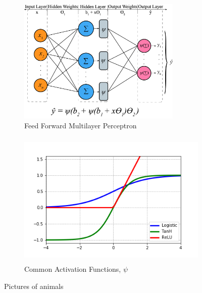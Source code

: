 	\begin{figure}
    \centering
    \begin{subfigure}[b]{0.55\textwidth}
        \includegraphics[height = 6cm, width=\textwidth]{img/mlp.png}
        \caption{Feed Forward Multilayer Perceptron}
        \label{fig:mlp}
    \end{subfigure}
    \hfill
    \begin{subfigure}[b]{0.44\textwidth}
        \includegraphics[height = 6.5cm, width=\textwidth]{img/actfunc.png}
        \caption{Common Activation Functions, $\psi$}
        \label{fig:tiger}
    \end{subfigure}
    \caption{Pictures of animals}\label{fig:animals}
\end{figure}